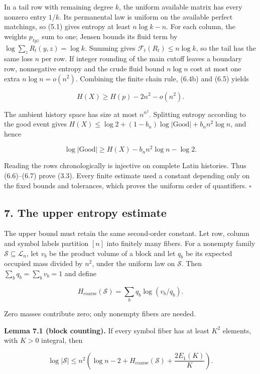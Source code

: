 \documentclass[english,11pt,a4paper]{article}
\newcounter{none}
\begin{document}
In a tail row with remaining degree \(k\), the uniform available matrix has every nonzero entry \(1/k\). Its permanental law is uniform on the available perfect matchings, so (5.1) gives entropy at least \(n\log k-n\). For each column, the weights \(p_{tyz}\) sum to one; Jensen bounds its fluid term by \(\log\sum_zR_t(y,z)=\log k\). Summing gives \(\mathcal F_t(R_t)\le n\log k\), so the tail has the same loss \(n\) per row. If integer rounding of the main cutoff leaves a boundary row, nonnegative entropy and the crude fluid bound \(n\log n\) cost at most one extra \(n\log n=o(n^2)\). Combining the finite chain rule, (6.4b) and (6.5) yields

\nopagebreak[4]
\[H(X)\ge H(p)-2n^2-o(n^2).\tag{6.6}\]

The ambient history space has size at most \(n^{n^2}\). Splitting entropy according to the good event gives \(H(X)\le\log2+(1-b_n)\log|\mathrm{Good}|+b_n n^2\log n\), and hence

\nopagebreak[4]
\[\log|\mathrm{Good}|\ge H(X)-b_n n^2\log n-\log2.\tag{6.7}\]

Reading the rows chronologically is injective on complete Latin histories. Thus (6.6)--(6.7) prove (3.3). Every finite estimate used a constant depending only on the fixed bounds and tolerances, which proves the uniform order of quantifiers. \(\square\)

\subsection{7. The upper entropy estimate}\label{the-upper-entropy-estimate}

The upper bound must retain the same second-order constant. Let row, column and symbol labels partition \([n]\) into finitely many fibers. For a nonempty family \(\mathcal S\subseteq\mathcal L_n\), let \(v_b\) be the product volume of a block and let \(q_b\) be its expected occupied mass divided by \(n^2\), under the uniform law on \(\mathcal S\). Then \(\sum_bq_b=\sum_bv_b=1\) and define

\nopagebreak[4]
\[H_{\mathrm{coarse}}(\mathcal S)=\sum_bq_b\log(v_b/q_b).\tag{7.1}\]

Zero masses contribute zero; only nonempty fibers are needed.

\textbf{Lemma 7.1 (block counting).} If every symbol fiber has at least \(K^2\) elements, with \(K>0\) integral, then

\nopagebreak[4]
\[\log|\mathcal S|\le n^2\left(\log n-2+H_{\mathrm{coarse}}(\mathcal S)
+\frac{2E_1(K)}K\right).\tag{7.2}\]
\end{document}
